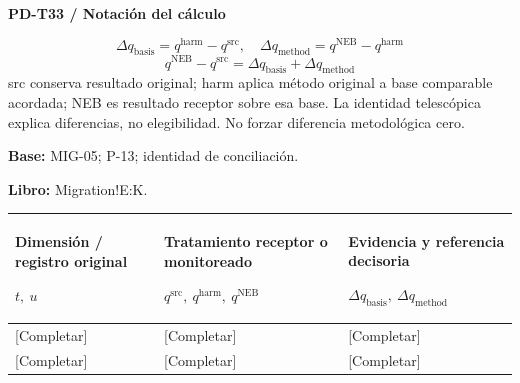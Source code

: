 \Needspace{112mm}
\par\begingroup\sffamily\fontsize{8}{10}\selectfont\color{NEBGreen}\setlength{\parskip}{2pt}\setlength{\abovedisplayskip}{4pt}\setlength{\belowdisplayskip}{4pt}\setlength{\abovedisplayshortskip}{2pt}\setlength{\belowdisplayshortskip}{3pt}
\textbf{PD-T33 / Notación del cálculo}\par
{\fontsize{9}{11}\selectfont\[ \Delta q_{\mathrm{basis}}=q^{\mathrm{harm}}-q^{\mathrm{src}},\quad \Delta q_{\mathrm{method}}=q^{\mathrm{NEB}}-q^{\mathrm{harm}} \]}
{\fontsize{9}{11}\selectfont\[ q^{\mathrm{NEB}}-q^{\mathrm{src}}=\Delta q_{\mathrm{basis}}+\Delta q_{\mathrm{method}} \]}
src conserva resultado original; harm aplica método original a base comparable acordada; NEB es resultado receptor sobre esa base. La identidad telescópica explica diferencias, no elegibilidad. No forzar diferencia metodológica cero.\par
\textbf{Base:} MIG-05; P-13; identidad de conciliación.\par
\textbf{Libro:} Migration!E:K.\par\endgroup
{\sffamily\fontsize{8.3}{10.3}\selectfont\begin{longtable}{@{}P{54.83mm} P{54.83mm} P{54.83mm}@{}}
\toprule
\textbf{Dimensión / registro original}\par {\normalfont\fontsize{8.2}{10}\selectfont $t,\ u$} & \textbf{Tratamiento receptor o monitoreado}\par {\normalfont\fontsize{8.2}{10}\selectfont $q^{\mathrm{src}},\ q^{\mathrm{harm}},\ q^{\mathrm{NEB}}$} & \textbf{Evidencia y referencia decisoria}\par {\normalfont\fontsize{8.2}{10}\selectfont $\Delta q_{\mathrm{basis}},\ \Delta q_{\mathrm{method}}$}\\\midrule\endhead
\rule{0pt}{8mm}[Completar] & [Completar] & [Completar]\\\hline
\rule{0pt}{8mm}[Completar] & [Completar] & [Completar]\\\hline
\end{longtable}}

